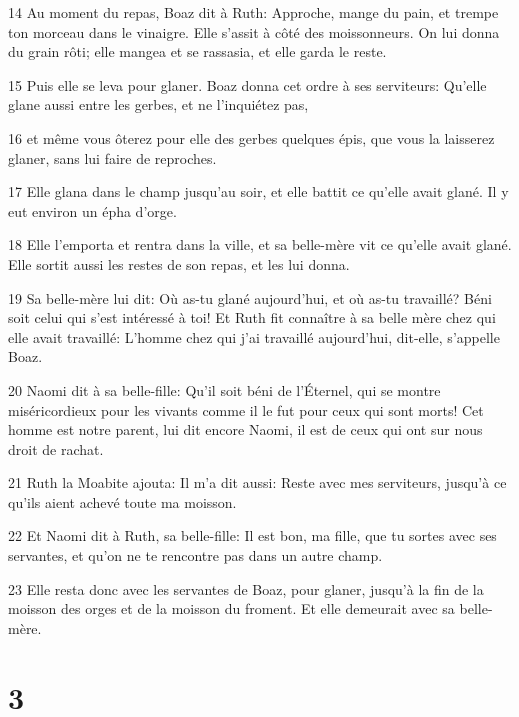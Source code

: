 \par 14 Au moment du repas, Boaz dit à Ruth: Approche, mange du pain, et trempe ton morceau dans le vinaigre. Elle s'assit à côté des moissonneurs. On lui donna du grain rôti; elle mangea et se rassasia, et elle garda le reste.
\par 15 Puis elle se leva pour glaner. Boaz donna cet ordre à ses serviteurs: Qu'elle glane aussi entre les gerbes, et ne l'inquiétez pas,
\par 16 et même vous ôterez pour elle des gerbes quelques épis, que vous la laisserez glaner, sans lui faire de reproches.
\par 17 Elle glana dans le champ jusqu'au soir, et elle battit ce qu'elle avait glané. Il y eut environ un épha d'orge.
\par 18 Elle l'emporta et rentra dans la ville, et sa belle-mère vit ce qu'elle avait glané. Elle sortit aussi les restes de son repas, et les lui donna.
\par 19 Sa belle-mère lui dit: Où as-tu glané aujourd'hui, et où as-tu travaillé? Béni soit celui qui s'est intéressé à toi! Et Ruth fit connaître à sa belle mère chez qui elle avait travaillé: L'homme chez qui j'ai travaillé aujourd'hui, dit-elle, s'appelle Boaz.
\par 20 Naomi dit à sa belle-fille: Qu'il soit béni de l'Éternel, qui se montre miséricordieux pour les vivants comme il le fut pour ceux qui sont morts! Cet homme est notre parent, lui dit encore Naomi, il est de ceux qui ont sur nous droit de rachat.
\par 21 Ruth la Moabite ajouta: Il m'a dit aussi: Reste avec mes serviteurs, jusqu'à ce qu'ils aient achevé toute ma moisson.
\par 22 Et Naomi dit à Ruth, sa belle-fille: Il est bon, ma fille, que tu sortes avec ses servantes, et qu'on ne te rencontre pas dans un autre champ.
\par 23 Elle resta donc avec les servantes de Boaz, pour glaner, jusqu'à la fin de la moisson des orges et de la moisson du froment. Et elle demeurait avec sa belle-mère.

\chapter{3}

